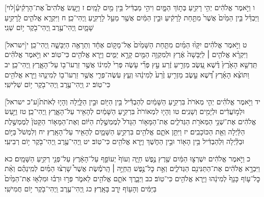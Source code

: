 \documentclass[twoside, openany, parskip=half, 11pt]{book}
\begin{document}
[לוי]ו וַיֹּ֣אמֶר אֱלֹהִ֔ים יְהִ֥י רָקִ֖יעַ בְּת֣וֹךְ הַמָּ֑יִם וִיהִ֣י מַבְדִּ֔יל בֵּ֥ין מַ֖יִם לָמָֽיִם׃ ז וַיַּ֣עַשׂ אֱלֹהִים֮ אֶת־הָרָקִ֒יעַ֒ וַיַּבְדֵּ֗ל בֵּ֤ין הַמַּ֙יִם֙ אֲשֶׁר֙ מִתַּ֣חַת לָרָקִ֔יעַ וּבֵ֣ין הַמַּ֔יִם אֲשֶׁ֖ר מֵעַ֣ל לָרָקִ֑יעַ וַֽיְהִי־כֵֽן׃ ח וַיִּקְרָ֧א אֱלֹהִ֛ים לָֽרָקִ֖יעַ שָׁמָ֑יִם וַֽיְהִי־עֶ֥רֶב וַֽיְהִי־בֹ֖קֶר י֥וֹם שֵׁנִֽי׃

[ישראל]ט וַיֹּ֣אמֶר אֱלֹהִ֗ים יִקָּו֨וּ הַמַּ֜יִם מִתַּ֤חַת הַשָּׁמַ֙יִם֙ אֶל־מָק֣וֹם אֶחָ֔ד וְתֵרָאֶ֖ה הַיַּבָּשָׁ֑ה וַֽיְהִי־כֵֽן׃ י וַיִּקְרָ֨א אֱלֹהִ֤ים ׀ לַיַּבָּשָׁה֙ אֶ֔רֶץ וּלְמִקְוֵ֥ה הַמַּ֖יִם קָרָ֣א יַמִּ֑ים וַיַּ֥רְא אֱלֹהִ֖ים כִּי־טֽוֹב׃ יא וַיֹּ֣אמֶר אֱלֹהִ֗ים תַּֽדְשֵׁ֤א הָאָ֙רֶץ֙ דֶּ֗שֶׁא עֵ֚שֶׂב מַזְרִ֣יעַ זֶ֔רַע עֵ֣ץ פְּרִ֞י עֹ֤שֶׂה פְּרִי֙ לְמִינ֔וֹ אֲשֶׁ֥ר זַרְעוֹ־ב֖וֹ עַל־הָאָ֑רֶץ וַֽיְהִי־כֵֽן׃ יב וַתּוֹצֵ֨א הָאָ֜רֶץ דֶּ֠שֶׁא עֵ֣שֶׂב מַזְרִ֤יעַ זֶ֙רַע֙ לְמִינֵ֔הוּ וְעֵ֧ץ עֹֽשֶׂה־פְּרִ֛י אֲשֶׁ֥ר זַרְעוֹ־ב֖וֹ לְמִינֵ֑הוּ וַיַּ֥רְא אֱלֹהִ֖ים כִּי־טֽוֹב׃ יג וַֽיְהִי־עֶ֥רֶב וַֽיְהִי־בֹ֖קֶר י֥וֹם שְׁלִישִֽׁי׃

[ע"כ ישראל]יד וַיֹּ֣אמֶר אֱלֹהִ֗ים יְהִ֤י מְאֹרֹת֙ בִּרְקִ֣יעַ הַשָּׁמַ֔יִם לְהַבְדִּ֕יל בֵּ֥ין הַיּ֖וֹם וּבֵ֣ין הַלָּ֑יְלָה וְהָי֤וּ לְאֹתֹת֙ וּלְמ֣וֹעֲדִ֔ים וּלְיָמִ֖ים וְשָׁנִֽים׃ טו וְהָי֤וּ לִמְאוֹרֹת֙ בִּרְקִ֣יעַ הַשָּׁמַ֔יִם לְהָאִ֖יר עַל־הָאָ֑רֶץ וַֽיְהִי־כֵֽן׃ טז וַיַּ֣עַשׂ אֱלֹהִ֔ים אֶת־שְׁנֵ֥י הַמְּאֹרֹ֖ת הַגְּדֹלִ֑ים אֶת־הַמָּא֤וֹר הַגָּדֹל֙ לְמֶמְשֶׁ֣לֶת הַיּ֔וֹם וְאֶת־הַמָּא֤וֹר הַקָּטֹן֙ לְמֶמְשֶׁ֣לֶת הַלַּ֔יְלָה וְאֵ֖ת הַכּוֹכָבִֽים׃ יז וַיִּתֵּ֥ן אֹתָ֛ם אֱלֹהִ֖ים בִּרְקִ֣יעַ הַשָּׁמָ֑יִם לְהָאִ֖יר עַל־הָאָֽרֶץ׃ יח וְלִמְשֹׁל֙ בַּיּ֣וֹם וּבַלַּ֔יְלָה וּֽלְהַבְדִּ֔יל בֵּ֥ין הָא֖וֹר וּבֵ֣ין הַחֹ֑שֶׁךְ וַיַּ֥רְא אֱלֹהִ֖ים כִּי־טֽוֹב׃ יט וַֽיְהִי־עֶ֥רֶב וַֽיְהִי־בֹ֖קֶר י֥וֹם רְבִיעִֽי׃

כ וַיֹּ֣אמֶר אֱלֹהִ֔ים יִשְׁרְצ֣וּ הַמַּ֔יִם שֶׁ֖רֶץ נֶ֣פֶשׁ חַיָּ֑ה וְעוֹף֙ יְעוֹפֵ֣ף עַל־הָאָ֔רֶץ עַל־פְּנֵ֖י רְקִ֥יעַ הַשָּׁמָֽיִם׃ כא וַיִּבְרָ֣א אֱלֹהִ֔ים אֶת־הַתַּנִּינִ֖ם הַגְּדֹלִ֑ים וְאֵ֣ת כׇּל־נֶ֣פֶשׁ הַֽחַיָּ֣ה ׀ הָֽרֹמֶ֡שֶׂת אֲשֶׁר֩ שָׁרְצ֨וּ הַמַּ֜יִם לְמִֽינֵהֶ֗ם וְאֵ֨ת כׇּל־ע֤וֹף כָּנָף֙ לְמִינֵ֔הוּ וַיַּ֥רְא אֱלֹהִ֖ים כִּי־טֽוֹב׃ כב וַיְבָ֧רֶךְ אֹתָ֛ם אֱלֹהִ֖ים לֵאמֹ֑ר פְּר֣וּ וּרְב֗וּ וּמִלְא֤וּ אֶת־הַמַּ֙יִם֙ בַּיַּמִּ֔ים וְהָע֖וֹף יִ֥רֶב בָּאָֽרֶץ׃ כג וַֽיְהִי־עֶ֥רֶב וַֽיְהִי־בֹ֖קֶר י֥וֹם חֲמִישִֽׁי׃
\end{document}

